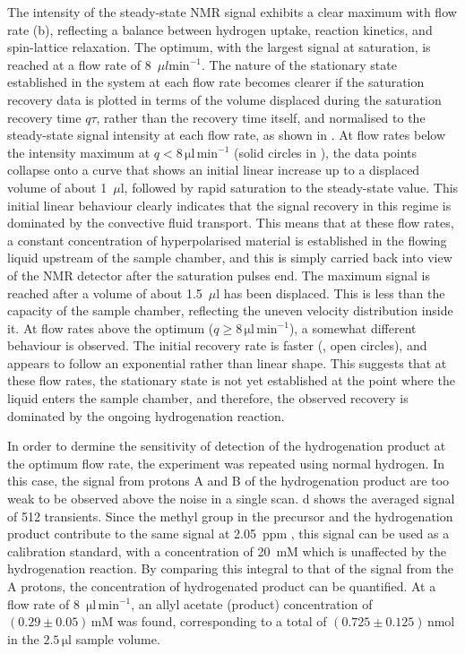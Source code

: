 The intensity of the steady-state NMR signal exhibits a clear maximum with flow
rate (b), reflecting a balance between hydrogen uptake,
reaction kinetics, and spin-lattice relaxation. The optimum, with the largest signal at
saturation, is reached at a flow rate of 8~$\mu l\text{min}^{-1}$.
The nature of the stationary state established in the system at each
flow rate becomes clearer if the saturation recovery data is plotted in terms
of the volume displaced during the saturation recovery time $q\tau$, rather
than the recovery time itself, and normalised to the steady-state signal intensity
at each flow rate, as shown in . At flow rates below
the intensity maximum at $q<8\,\mathrm{\mu l\,\text{min}^{-1}}$ (solid
circles in ),
the data points collapse onto a curve that shows an initial linear increase
up to a displaced volume of about 1~$\mu$l, followed by rapid saturation to the
steady-state value. This initial linear behaviour clearly indicates that the
signal recovery in this regime is dominated by the convective fluid transport.
This means that at these flow rates, a constant concentration of
hyperpolarised material is established in the flowing liquid upstream of the
sample chamber, and this is simply carried back into view of the NMR detector
after the saturation pulses end. The maximum signal is reached after a volume
of about 1.5~$\mu$l has been displaced. This is less than the capacity
of the sample chamber, reflecting the uneven velocity distribution inside it.
At flow rates above the optimum ($q\ge 8\,\mathrm{\mu l\,\text{min}^{-1}}$),
a somewhat different behaviour is observed. The initial recovery rate is
faster (, open circles), and appears to follow
an exponential rather than linear shape. This suggests that at these flow
rates, the stationary state is not yet established at the point where the
liquid enters the sample chamber, and therefore, the observed recovery
is dominated by the ongoing hydrogenation reaction.

In order to dermine the sensitivity of detection of the hydrogenation product
at the optimum flow rate, the experiment was repeated using normal hydrogen.
In this case, the signal from  protons A and B  of the hydrogenation product
are too weak to be observed above the noise in a single scan. d
shows the averaged signal of 512 transients. Since the methyl group in the
precursor and the hydrogenation product contribute to the same signal at 2.05~ppm ,
this signal can be used as a calibration standard, with a concentration of 20~mM
which is unaffected by the hydrogenation reaction. By comparing this integral to that
of the signal from the A protons, the concentration of hydrogenated product can be
quantified. At a flow rate of 8~$\mathrm{\mu l\,\text{min}^{-1}}$, an allyl acetate
(product) concentration of $(0.29\pm 0.05)\,\mathrm{mM}$ was found, corresponding to a total
of $(0.725\pm0.125)\,\text{nmol}$ in the $2.5\,\mathrm{\mu l}$ sample volume.

